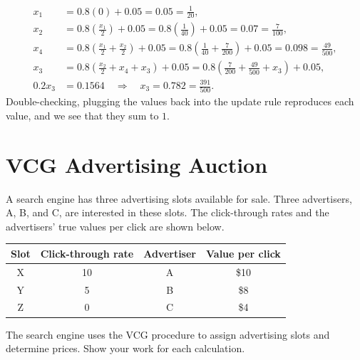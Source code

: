 \documentclass[newpages]{assignment}
\begin{document}
\[
    \begin{aligned}
        x_1    & =0.8(0)+0.05=0.05=\frac1{20},                                \\
        x_2    & =0.8\left(\frac{x_1}{2}\right)+0.05
        =0.8\left(\frac1{40}\right)+0.05=0.07=\frac7{100},                    \\
        x_4    & =0.8\left(\frac{x_1}{2}+\frac{x_2}{2}\right)+0.05
        =0.8\left(\frac1{40}+\frac7{200}\right)+0.05=0.098=\frac{49}{500},    \\
        x_3    & =0.8\left(\frac{x_2}{2}+x_4+x_3\right)+0.05
        =0.8\left(\frac7{200}+\frac{49}{500}+x_3\right)+0.05,                 \\
        0.2x_3 & =0.1564 \quad\Longrightarrow\quad x_3=0.782=\frac{391}{500}.
    \end{aligned}
\]
Double-checking, plugging the values back into the update rule reproduces each value, and we see that they sum to $1$.

\section{VCG Advertising Auction}

\begin{problem}
    A search engine has three advertising slots available for sale. Three advertisers, A, B, and C, are interested in these slots. The click-through rates and the advertisers' true values per click are shown below.

    \begin{center}
        \begin{tabular}{cccc}
            \toprule
            Slot & Click-through rate & Advertiser & Value per click \\
            \midrule
            X    & 10                 & A          & \$10            \\
            Y    & 5                  & B          & \$8             \\
            Z    & 0                  & C          & \$4             \\
            \bottomrule
        \end{tabular}
    \end{center}

    The search engine uses the VCG procedure to assign advertising slots and determine prices. Show your work for each calculation.
\end{problem}
\end{document}

